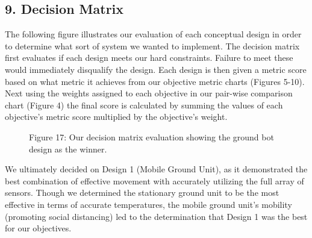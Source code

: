 ﻿\documentclass[10pt]{article}
\begin{document}
\subsection{9. Decision Matrix}
The following figure illustrates our evaluation of each conceptual design in order to determine what sort of system we wanted to implement. The decision matrix first evaluates if each design meets our hard constraints. Failure to meet these would immediately disqualify the design. Each design is then given a metric score based on what metric it achieves from our objective metric charts (Figures 5-10). Next using the weights assigned to each objective in our pair-wise comparison chart (Figure 4) the final score is calculated by summing the values of each objective's metric score multiplied by the objective’s weight. 
%
%	
%
%	
%
%	
%
%	
\begin{figure}
\caption{Figure 17: Our decision matrix evaluation showing the ground bot design as the winner.}
\label{fig:17}
\end{figure}

We ultimately decided on Design 1 (Mobile Ground Unit), as it demonstrated the best combination of effective movement with accurately utilizing the full array of sensors. Though we determined the stationary ground unit to be the most effective in terms of accurate temperatures, the mobile ground unit’s mobility (promoting social distancing) led to the determination that Design 1 was the best for our objectives.
\end{document}
